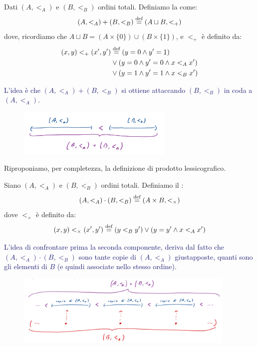 \begin{definition}
	Dati $(A,<_A)$ e $(B,<_B)$ ordini totali. Definiamo la  come:
	\[ (A,<_A) + (B,<_B) \overset{\text{def}}{=} (A \sqcup B, <_+)
		\]
	dove, ricordiamo che $A \sqcup B = (A \times\{0\}) \cup (B \times \{1\})$, e $<_+$ è definito da:
	\[ \begin{split}
		(x,y) <_+ (x',y') &\overset{\text{def}}{=} (y = 0 \land y' = 1) \\
						  &\lor (y = 0 \land y' = 0 \land x <_A x') \\
						  &\lor (y = 1 \land y' = 1 \land x <_B x')
	\end{split}
		\]
\end{definition}

\textcolor{MidnightBlue}{L'idea è che $(A,<_A) + (B,<_B)$ si ottiene attaccando $(B,<_B)$ in coda a $(A,<_A)$}.

\begin{figure}[H]
	\centering
	\includegraphics[width = 7.5cm]{immagini/somma_ordini_totali.png}
\end{figure}

Riproponiamo, per completezza, la definizione di prodotto lessicografico.

\begin{definition}
	Siano $(A,<_A)$ e $(B,<_B)$ ordini totali. Definiamo il :
	\[ (A,<_A) \cdot (B,<_B) \overset{\text{def}}{=} (A \times B, <_\times)
		\]
	dove $<_\times$ è definito da:
	\[ (x,y) <_\times (x',y') \overset{\text{def}}{=} (y <_B y') \lor (y = y' \land x <_A x')
		\]
\end{definition}

\textcolor{MidnightBlue}{L'idea di confrontare prima la seconda componente, deriva dal fatto che $(A,<_A) \cdot (B,<_B)$ sono 
tante copie di $(A,<_A)$ giustapposte, quanti sono gli elementi di $B$ (e quindi associate nello stesso ordine)}.

\begin{figure}[H]
	\centering
	\includegraphics[width = 10.5cm]{immagini/ordine_lessicografico.png}
\end{figure}

